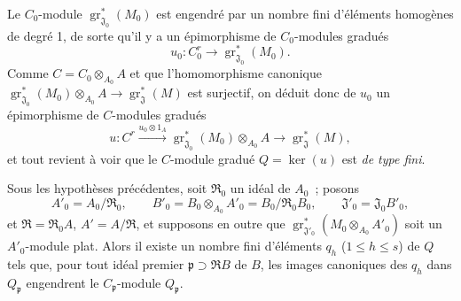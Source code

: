 
Le $C_0$-module $\operatorname{gr}_{\mathfrak J_0}^*(M_0)$ est engendré par
un nombre fini d'éléments homogènes de degré 1, de sorte qu'il y a un
épimorphisme de $C_0$-modules gradués
\[
u_0:C_0^r\longrightarrow\operatorname{gr}_{\mathfrak J_0}^*(M_0).
\]
Comme $C=C_0\otimes_{A_0}A$ et que l'homomorphisme canonique
$\operatorname{gr}_{\mathfrak J_0}^*(M_0)\otimes_{A_0}A
\to\operatorname{gr}_{\mathfrak J}^*(M)$ est surjectif, on déduit donc de
$u_0$ un épimorphisme de $C$-modules gradués
\[
u:C^r\xrightarrow{u_0\otimes1_A}
\operatorname{gr}_{\mathfrak J_0}^*(M_0)\otimes_{A_0}A
\longrightarrow\operatorname{gr}_{\mathfrak J}^*(M),
\]
et tout revient à voir que le $C$-module gradué $Q=\ker(u)$ est \emph{de type
fini}.

\begin{lemma}[11.2.9.6]
\label{IV.11.2.9.6-fr}
Sous les hypothèses précédentes, soit $\mathfrak R_0$ un idéal de $A_0$~;
posons
\[
A'_0=A_0/\mathfrak R_0,\qquad
B'_0=B_0\otimes_{A_0}A'_0=B_0/\mathfrak R_0B_0,\qquad
\mathfrak J'_0=\mathfrak J_0B'_0,
\]
et $\mathfrak R=\mathfrak R_0A$, $A'=A/\mathfrak R$, et supposons en outre
que $\operatorname{gr}_{\mathfrak J'_0}^*(M_0\otimes_{A_0}A'_0)$ soit un
$A'_0$-module plat. Alors il existe un nombre fini d'éléments $q_h$
($1\leq h\leq s$) de $Q$ tels que, pour tout idéal premier
$\mathfrak p\supset\mathfrak RB$ de $B$, les images canoniques des $q_h$ dans
$Q_\mathfrak p$ engendrent le $C_\mathfrak p$-module $Q_\mathfrak p$.
\end{lemma}

